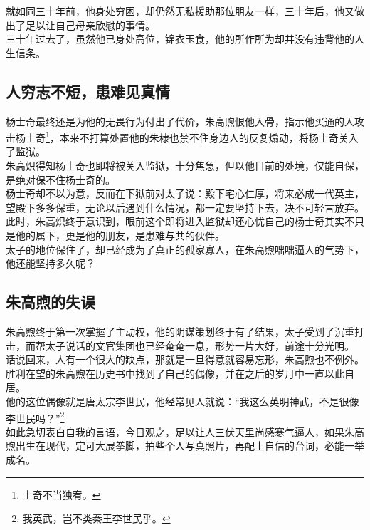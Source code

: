\begin{multicols}{\theparacolNo}
就如同三十年前，他身处穷困，却仍然无私援助那位朋友一样，三十年后，他又做出了足以让自己母亲欣慰的事情。\\

三十年过去了，虽然他已身处高位，锦衣玉食，他的所作所为却并没有违背他的人生信条。\\

\subsection{人穷志不短，患难见真情}
杨士奇最终还是为他的无畏行为付出了代价，朱高煦恨他入骨，指示他买通的人攻击杨士奇\footnote{士奇不当独宥。}，本来不打算处置他的朱棣也禁不住身边人的反复煽动，将杨士奇关入了监狱。\\

朱高炽得知杨士奇也即将被关入监狱，十分焦急，但以他目前的处境，仅能自保，是绝对保不住杨士奇的。\\

杨士奇却不以为意，反而在下狱前对太子说：殿下宅心仁厚，将来必成一代英主，望殿下多多保重，无论以后遇到什么情况，都一定要坚持下去，决不可轻言放弃。\\

此时，朱高炽终于意识到，眼前这个即将进入监狱却还心忧自己的杨士奇其实不只是他的属下，更是他的朋友，是患难与共的伙伴。\\

太子的地位保住了，却已经成为了真正的孤家寡人，在朱高煦咄咄逼人的气势下，他还能坚持多久呢？\\

\subsection{朱高煦的失误}
朱高煦终于第一次掌握了主动权，他的阴谋策划终于有了结果，太子受到了沉重打击，而帮太子说话的文官集团也已经奄奄一息，形势一片大好，前途十分光明。\\

话说回来，人有一个很大的缺点，那就是一旦得意就容易忘形，朱高煦也不例外。\\

胜利在望的朱高煦在历史书中找到了自己的偶像，并在之后的岁月中一直以此自居。\\

他的这位偶像就是唐太宗李世民，他经常见人就说：“我这么英明神武，不是很像李世民吗？”\footnote{我英武，岂不类秦王李世民乎。}\\

如此急切表白自我的言语，今日观之，足以让人三伏天里尚感寒气逼人，如果朱高煦出生在现代，定可大展拳脚，拍些个人写真照片，再配上自信的台词，必能一举成名。\\


\end{multicols}
